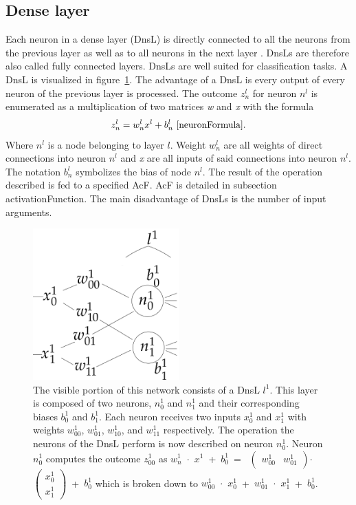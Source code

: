 \subsection{Dense layer}\label{denseLayers}
Each neuron in a dense layer (DnsL) is directly connected to all the neurons from the previous layer as well as to all neurons in the next layer \cite{CNN}. DnsLs are therefore also called fully connected layers. DnsLs are well suited for classification tasks. A DnsL is visualized in figure~\ref{denseLayerVisualization}. The advantage of a DnsL is every output of every neuron of the previous layer is processed. The outcome ${z^l_n}$ for neuron ${n^l}$  is enumerated as a multiplication of two matrices \textit{w} and \textit{x} with the formula \[{z^l_{n}}=w^l_n  x^l + b^l_n~\cite{neuronFormula}\text{.}\] Where ${n^l}$ is a node belonging to layer ${l}$. Weight ${w^l_n}$ are all weights of direct connections into neuron ${n^l}$ and \textit{x} are all inputs of said connections into neuron ${n^l}$. The notation ${b^l_n}$ symbolizes the bias of node ${n^l}$. The result of the operation described is fed to a specified AcF. AcF is detailed in subsection {activationFunction}. The main disadvantage of DnsLs is the number of input arguments.
\begin{figure}
  \includegraphics[width=0.5\textwidth]{Images/denseLayer.png}
  \caption[rightcaption]{The visible portion of this network consists of a DnsL ${l^1}$. This layer is composed of two neurons, ${n^1_0}$ and ${n^1_1}$ and their corresponding biases ${b^1_0}$ and ${b^1_1}$. Each neuron receives two inputs ${x^1_{0}}$ and ${x^1_{1}}$ with weights ${w^1_{00}}$, ${w^1_{01}}$, ${w^1_{10}}$, and ${w^1_{11}}$ respectively. The operation the neurons of the DnsL perform is now described on neuron ${n^1_{0}}$. Neuron ${n^1_{0}}$ computes the outcome ${z^1_{00}}$ as 
${w^1_{n}}$~$\cdot$~${x^1}$~+~${b^1_0}$~=~
 $\left(\begin{smallmatrix}{w^1_{00}}&{w^1_{01}}\end{smallmatrix}\right)$$\cdot$$\left(\begin{smallmatrix}{x^1_{0}}\\{x^1_{1}}\end{smallmatrix}\right)$~+~${b^1_0}$
which is broken down to ${w^1_{00}}$~$\cdot$~${x^1_{0}}$~+~${w^1_{01}}$~$\cdot$~${x^1_{1}}$~+~${b^1_0}$.
}
  \label{denseLayerVisualization}
\end{figure} 

